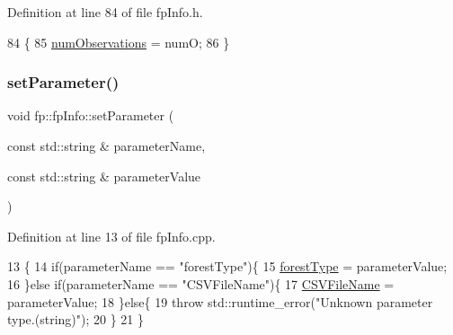 Definition at line 84 of file fp\+Info.\+h.


\begin{DoxyCode}
84                                                            \{
85                 \hyperlink{classfp_1_1fpInfo_a1b35cd17d4ddb35e232246a6549d7a74}{numObservations} = numO;
86             \}
\end{DoxyCode}
\mbox{\label{classfp_1_1fpInfo_ae4c749c466e983cb312cc08d38b2796e}} 
\subsubsection{\texorpdfstring{set\+Parameter()}{setParameter()}\hspace{0.1cm}{\footnotesize\ttfamily [1/3]}}
{\footnotesize\ttfamily void fp\+::fp\+Info\+::set\+Parameter (\begin{DoxyParamCaption}\item[{const std\+::string \&}]{parameter\+Name,  }\item[{const std\+::string \&}]{parameter\+Value }\end{DoxyParamCaption})}



Definition at line 13 of file fp\+Info.\+cpp.


\begin{DoxyCode}
13                                                                                             \{
14         \textcolor{keywordflow}{if}(parameterName == \textcolor{stringliteral}{"forestType"})\{
15             \hyperlink{classfp_1_1fpInfo_a3001fbf80d86022e53578d6adf133b90}{forestType} = parameterValue;
16         \}\textcolor{keywordflow}{else} \textcolor{keywordflow}{if}(parameterName == \textcolor{stringliteral}{"CSVFileName"})\{
17             \hyperlink{classfp_1_1fpInfo_aac01e5ddb27bc333e172a0422066af1c}{CSVFileName} = parameterValue;
18         \}\textcolor{keywordflow}{else}\{
19             \textcolor{keywordflow}{throw} std::runtime\_error(\textcolor{stringliteral}{"Unknown parameter type.(string)"});
20         \}
21     \}
\end{DoxyCode}
\mbox{\label{classfp_1_1fpInfo_a8ef4332ee98a1724ffd8614c4f80af91}} 
